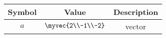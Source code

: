 \begin{tabular}{|c|c|c|}
\hline
\textbf{Symbol} & \textbf{Value} & \textbf{Description} \\
\hline
$a$ & $\myvec{2\\-1\\-2}$ & vector \\
\hline
\end{tabular}


